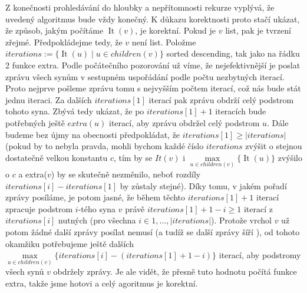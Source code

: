 \documentclass[12pt,a4paper]{article}
\theoremstyle{plain}
\newcommand{\It}{\operatorname{It}}
\begin{document}
Z konečnosti prohledávání do hloubky a nepřítomnosti rekurze vyplývá, že uvedený algoritmus bude vždy konečný. K důkazu korektnosti proto stačí ukázat, že způsob, jakým počítáme $ \It(v) $, je korektní. Pokud je $ v $ list, pak je tvrzení zřejmé. Předpokládejme tedy, že $ v $ není list. Položme $iterations :=  \{ \It(u) \mid u \in children(v) \}$ sorted descending, tak jako na řádku 2 funkce extra.  Podle počátečního pozorování už víme, že nejefektivnější je poslat zprávu všech synům v sestupném uspořádání podle počtu nezbytných iterací. Proto nejprve pošleme zprávu tomu s nejvyšším počtem iterací, což nás bude stát jednu iteraci. Za dalších $iterations[1]$ iterací pak zprávu obdrží celý podstrom tohoto syna. Zbývá tedy ukázat, že po $iterations[1]+1$ iteracích bude potřebných ještě $extra(u)$ iterací, aby zprávu obdržel celý podstrom $u$. Dále budeme bez újmy na obecnosti předpokládat, že $iterations[1]\geq |iterations|$ (pokud by to nebyla pravda, mohli bychom každé číslo $iterations$ zvýšit o stejnou dostatečně velkou konstantu $c$, tím by se $It(v)$ i $\max\limits_{u \in children(v)}\{\It(u)\}$ zvýšilo o $c$ a extra($v$) by se skutečně nezměnilo, neboť rozdíly $iterations[i]-iterations[1]$ by zůstaly stejné). Díky tomu, v jakém pořadí zprávy posíláme, je potom jasné, že během těchto $iterations[1]+1$ iterací zpracuje podstrom $i$-tého syna $v$ právě $iterations[1]+1-i\geq 1$ iterací z $iterations[i]$ nutných (pro všechna $i\in{1,\dots,|iterations|}$). Protože vrchol $v$ už potom žádné další zprávy posílat nemusí (a tudíž se další zprávy šíří ), od tohoto okamžiku potřebujeme ještě dalších $\max\limits_{u \in children(v)}\{iterations[i]-(iterations[1]+1-i)\}$ iterací, aby podstromy všech synů $v$ obdržely zprávy. Je ale vidět, že přesně tuto hodnotu počítá funkce extra, takže jsme hotovi a celý agoritmus je korektní.\\


\end{document}

